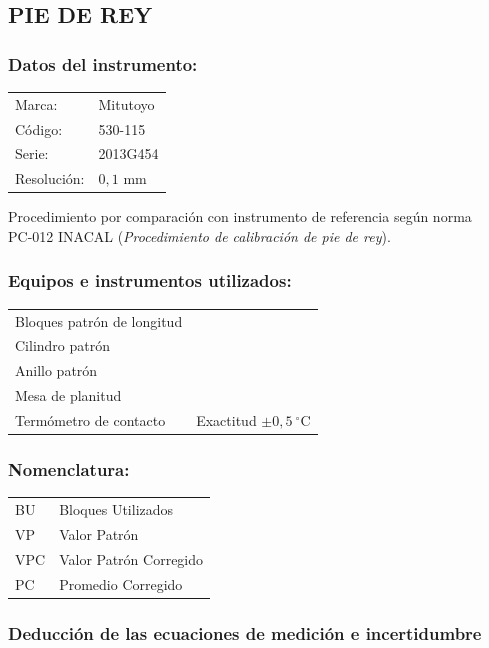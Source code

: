\subsection{PIE DE REY}
\subsubsection*{Datos del instrumento:}
\begin{tabular}{ll}
Marca:      & Mitutoyo\\[3pt]
Código:     & 530-115\\[3pt]
Serie:      & 2013G454\\[3pt]
Resolución: & $0{,}1\text{ mm}$
\end{tabular}

\vspace{6pt}
Procedimiento por comparación con instrumento de referencia según norma\\ PC-012 INACAL (\textit{Procedimiento de calibración de pie de rey}).

\vspace{12pt}
\subsubsection*{Equipos e instrumentos utilizados:}
\begin{tabular}{ll}
Bloques patrón de longitud & \\[3pt]
Cilindro patrón            & \\[3pt]
Anillo patrón              & \\[3pt]
Mesa de planitud           & \\[3pt]
Termómetro de contacto     & Exactitud $\pm 0{,}5\ ^\circ\text{C}$
\end{tabular}

\vspace{12pt}
\subsubsection*{Nomenclatura:}
\begin{tabular}{ll}
BU  & Bloques Utilizados\\[3pt]
VP  & Valor Patrón\\[3pt]
VPC & Valor Patrón Corregido\\[3pt]
PC  & Promedio Corregido
\end{tabular}

\vspace{12pt}
\subsubsection{Deducción de las ecuaciones de medición e incertidumbre}

